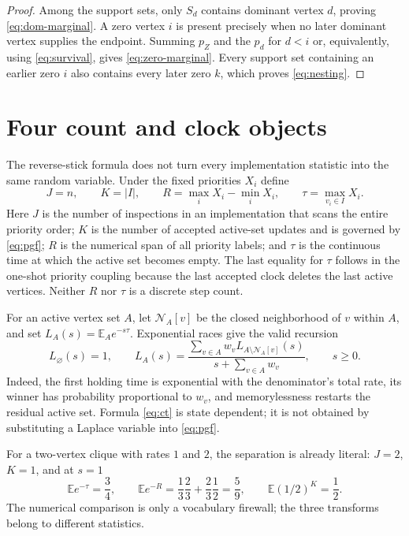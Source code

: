 \documentclass[10pt,a4paper]{amsart}
\theoremstyle{remark}
\newcommand{\Nbh}{\mathcal N}
\begin{document}
\begin{proof}
Among the support sets, only $S_d$ contains dominant vertex $d$, proving
\eqref{eq:dom-marginal}.  A zero vertex $i$ is present precisely when no later
dominant vertex supplies the endpoint.  Summing $p_Z$ and the $p_d$ for $d<i$
or, equivalently, using \eqref{eq:survival}, gives
\eqref{eq:zero-marginal}.  Every support set containing an earlier zero $i$
also contains every later zero $k$, which proves \eqref{eq:nesting}.
\end{proof}

\section{Four count and clock objects}

The reverse-stick formula does not turn every implementation statistic into
the same random variable.  Under the fixed priorities $X_i$ define
\[
 J=n,\qquad K=|I|,\qquad
 R=\max_iX_i-\min_iX_i,\qquad
 \tau=\max_{v_i\in I}X_i.
\]
Here $J$ is the number of inspections in an implementation that scans the
entire priority order; $K$ is the number of accepted active-set updates and is
governed by \eqref{eq:pgf}; $R$ is the numerical span of all priority labels;
and $\tau$ is the continuous time at which the active set becomes empty.  The
last equality for $\tau$ follows in the one-shot priority coupling because the
last accepted clock deletes the last active vertices.  Neither $R$ nor $\tau$
is a discrete step count.

For an active vertex set $A$, let $\Nbh_A[v]$ be the closed neighborhood of
$v$ within $A$, and set $L_A(s)=\mathbb E_Ae^{-s\tau}$.  Exponential races give
the valid recursion
\begin{equation}\label{eq:ct}
 L_\varnothing(s)=1,\qquad
 L_A(s)=\frac{\displaystyle\sum_{v\in A}w_v
 L_{A\setminus\Nbh_A[v]}(s)}
 {s+\displaystyle\sum_{v\in A}w_v},\qquad s\geq0.
\end{equation}
Indeed, the first holding time is exponential with the denominator's total
rate, its winner has probability proportional to $w_v$, and memorylessness
restarts the residual active set.  Formula \eqref{eq:ct} is state dependent;
it is not obtained by substituting a Laplace variable into \eqref{eq:pgf}.

For a two-vertex clique with rates $1$ and $2$, the separation is already
literal: $J=2$, $K=1$, and at $s=1$
\begin{equation}\label{eq:firewall}
 \mathbb Ee^{-\tau}=\frac34,\qquad
 \mathbb Ee^{-R}=\frac13\frac23+\frac23\frac12=\frac59,
 \qquad \mathbb E(1/2)^K=\frac12.
\end{equation}
The numerical comparison is only a vocabulary firewall; the three transforms
belong to different statistics.
\end{document}
